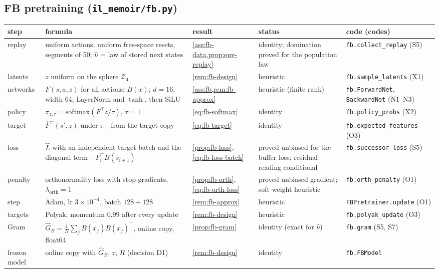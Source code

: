\subsection{FB pretraining (\texttt{il\_memoir/fb.py})}

{\small
\begin{longtable}{@{}>{\raggedright\arraybackslash}p{1.8cm}>{\raggedright\arraybackslash}p{3.9cm}>{\raggedright\arraybackslash}p{2.9cm}>{\raggedright\arraybackslash}p{1.9cm}>{\raggedright\arraybackslash\footnotesize}p{3.5cm}@{}}
\toprule
step & formula & result & status & code (codes)\\
\midrule\endhead
\bottomrule\endfoot
replay & uniform actions, uniform free-space resets, segments of 50; $\hat\nu$ = law of stored next states & \cref{ass:fb-data,prop:env-replay} & identity; domination proved for the population law & \nolinkurl{fb.collect_replay} (S5)\\
latents & $z$ uniform on the sphere $\mathcal Z_4$ & \cref{rem:fb-design} & heuristic & \nolinkurl{fb.sample_latents} (X1)\\
networks & $F(s,a,z)$ for all actions; $B(x)$; $d=16$, width 64; LayerNorm and $\tanh$, then SiLU & \cref{ass:fb,rem:fb-approx} & heuristic (finite rank) & \nolinkurl{fb.ForwardNet}, \nolinkurl{BackwardNet} (N1--N3)\\
policy & $\pi_{z,\tau}=\mathrm{softmax}(F^\top z/\tau)$, $\tau=1$ & \eqref{eq:fb-softmax} & identity & \nolinkurl{fb.policy_probs} (X2)\\
target & $\bar F^-(s',z)$ under $\pi^-_z$ from the target copy & \eqref{eq:fb-target} & identity & \nolinkurl{fb.expected_features} (O3)\\
loss & $\hat L$ with an independent target batch and the diagonal term $-F_i^\top B(s_{i+1})$ & \cref{prop:fb-loss}, \eqref{eq:fb-loss-batch} & proved unbiased for the buffer loss; residual reading conditional & \nolinkurl{fb.successor_loss} (S5)\\
penalty & orthonormality loss with stop-gradients, $\lambda_{\mathrm{orth}}=1$ & \cref{prop:fb-orth}, \eqref{eq:fb-orth-loss} & proved unbiased gradient; soft weight heuristic & \nolinkurl{fb.orth_penalty} (O1)\\
step & Adam, lr $3\times10^{-4}$, batch $128+128$ & \cref{rem:fb-approx} & heuristic & \nolinkurl{FBPretrainer.update} (O1)\\
targets & Polyak, momentum $0.99$ after every update & \cref{rem:fb-design} & heuristic & \nolinkurl{fb.polyak_update} (O3)\\
Gram & $\hat G_B=\frac1N\sum_jB(x_j)B(x_j)^\top$, online copy, float64 & \cref{prop:fb-gram} & identity (exact for $\hat\nu$) & \nolinkurl{fb.gram} (S5, S7)\\
frozen model & online copy with $\hat G_B$, $\tau$, $R$ (decision D1) & \cref{rem:fb-design} & identity & \nolinkurl{fb.FBModel}\\
\end{longtable}}

